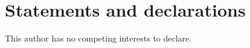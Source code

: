 \documentclass[pdflatex,sn-apa,11pt]{sn-jnl}%
\begin{document}



\backmatter




\section*{Statements and declarations}
This author has no competing interests to declare.

\end{document}
